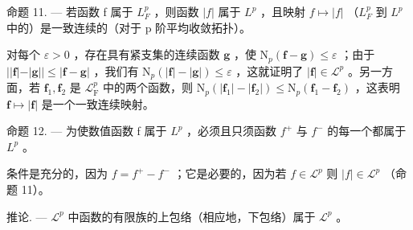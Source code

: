 命题 11. --- 若函数 f 属于 \(L_{F}^{p}\) ，则函数 \(|f|\) 属于 \(L^{p}\) ，且映射 \(f \mapsto |f|\) （\(L_{F}^{p}\) 到 \(L^{p}\) 中的）是一致连续的（对于 p 阶平均收敛拓扑）。

对每个 \(\varepsilon > 0\) ，存在具有紧支集的连续函数 \(\mathbf{g}\) ，使 \(\mathrm{N}_p(\mathbf{f} - \mathbf{g}) \leqslant \varepsilon\) ；由于 \(||\mathbf{f}| - |\mathbf{g}|| \leqslant |\mathbf{f} - \mathbf{g}|\) ，我们有 \(\mathrm{N}_p(|\mathbf{f}| - |\mathbf{g}|) \leqslant \varepsilon\) ，这就证明了 \(|\mathbf{f}| \in \mathcal{L}^p\) 。另一方面，若 \(\mathbf{f}_1, \mathbf{f}_2\) 是 \(\mathcal{L}_{\mathrm{F}}^p\) 中的两个函数，则 \(\mathrm{N}_p(|\mathbf{f}_1| - |\mathbf{f}_2|) \leqslant \mathrm{N}_p(\mathbf{f}_1 - \mathbf{f}_2)\) ，这表明 \(\mathbf{f} \mapsto |\mathbf{f}|\) 是一个一致连续映射。

命题 12. --- 为使数值函数 f 属于 \(L^{p}\) ，必须且只须函数 \(f^{+}\) 与 \(f^{-}\) 的每一个都属于 \(L^{p}\) 。

条件是充分的，因为 \(f = f^{+} - f^{-}\) ；它是必要的，因为若 \(f \in \mathcal{L}^p\) 则 \(|f| \in \mathcal{L}^p\) （命题 11）。

推论. --- \(\mathcal{L}^{p}\) 中函数的有限族的上包络（相应地，下包络）属于 \(\mathcal{L}^{p}\) 。


